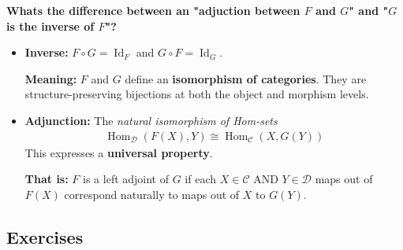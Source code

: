\documentclass[12pt,a4paper]{report}
\newcommand{\CAT}[1]{\mathscr{#1}}
\begin{document}
\HLINE
\begin{remark}[ChatGPT] \textbf{Whats the difference between an "adjuction between $F$ and $G$" and "$G$ is the inverse of $F$"?}  
\begin{itemize}
	\item \textbf{Inverse:} $F \circ G = \operatorname{Id}_F$ and $G \circ F = \operatorname{Id}_G$.  
	
	\textbf{Meaning: }$F$ and $G$ define an \textbf{isomorphism of categories}. They are structure-preserving bijections at both the object and morphism levels.
	
	\item \textbf{Adjunction:} The \textit{natural isomorphism of Hom-sets} 
	\begin{align*}
		\operatorname{Hom}_\CAT{D}(F(X), Y) \cong \operatorname{Hom}_\CAT{C}(X, G(Y))
	\end{align*}This expresses a \textbf{universal property}.
	
	\textbf{That is: } $F$ is a left adjoint of $G$ if each $X\in \CAT{C}$ AND $Y \in \CAT{D}$ maps out of $F(X)$ correspond naturally to maps out of $X$ to $G(Y)$.
\end{itemize}
\end{remark}
\HLINE

\subsection{Exercises}
\end{document}
